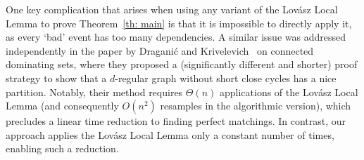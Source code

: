 \documentclass[notitlepage]{scrartcl}
\newcommand{\br}[1]{\llbracket{#1}\rrbracket}
\begin{document}
One key complication that arises when using any variant of the Lov\'asz Local Lemma to prove Theorem~\ref{th: main} is that it is impossible to directly apply it, as every `bad' event has too many dependencies. A similar issue was addressed independently in the paper by Dragani\'c and Krivelevich~\cite{DK} on connected dominating sets, where they proposed a (significantly different and shorter) proof strategy to show that a $d$-regular graph without short close cycles has a nice partition. Notably, their method requires $\Theta(n)$ applications of the Lov\'asz Local Lemma (and consequently $O(n^2)$ resamples in the algorithmic version), which precludes a linear time reduction to finding perfect matchings. In contrast, our approach applies the Lov\'asz Local Lemma only a constant number of times, enabling such a reduction.






\end{document}
